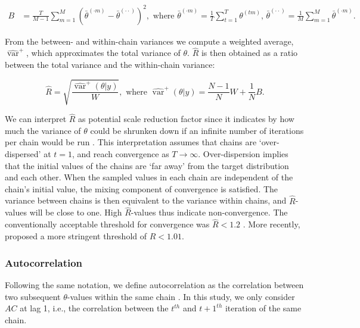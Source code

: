 \documentclass[Royal,times,sageh]{sagej}
\begin{document}
\begin{align*}
B&=\frac{T}{M-1} \sum_{m=1}^{M}\left(\bar{\theta}^{(\cdot m)}-\bar{\theta}^{(\cdot \cdot)}\right)^{2}, \text { where } \bar{\theta}^{(\cdot m)}=\frac{1}{T} \sum_{t=1}^{T} \theta^{(t m)} \text{, } \bar{\theta}^{(\cdot \cdot)}=\frac{1}{M} \sum_{m=1}^{M} \bar{\theta}^{(\cdot m)}. 
\end{align*}

\noindent From the between- and within-chain variances we compute a weighted average, \(\widehat{\operatorname{var}}^{+}\), which approximates the total variance of \(\theta\). \(\widehat{R}\) is then obtained as a ratio between the total variance and the within-chain variance:

\begin{equation*}
\widehat{R}=\sqrt{\frac{\widehat{\operatorname{var}}^{+}(\theta | y)}{W}},
\text{ where } \widehat{\operatorname{var}}^{+}(\theta | y)=\frac{N-1}{N} W+\frac{1}{N} B.
\end{equation*}

We can interpret \(\widehat{R}\) as potential scale reduction factor since it indicates by how much the variance of \(\theta\) could be shrunken down if an infinite number of iterations per chain would be run \citep{gelm92}. This interpretation assumes that chains are `over-dispersed' at \(t=1\), and reach convergence as \(T \to \infty\). Over-dispersion implies that the initial values of the chains are `far away' from the target distribution and each other. When the sampled values in each chain are independent of the chain's initial value, the mixing component of convergence is satisfied. The variance between chains is then equivalent to the variance within chains, and \(\widehat{R}\)-values will be close to one. High \(\widehat{R}\)-values thus indicate non-convergence. The conventionally acceptable threshold for convergence was \(\widehat{R} < 1.2\) \citep{gelm92}. More recently, \citet{veht19} proposed a more stringent threshold of \(\widehat{R} < 1.01\).

\hypertarget{autocorrelation}{%
\subsubsection{Autocorrelation}\label{autocorrelation}}

Following the same notation, we define autocorrelation as the correlation between two subsequent \(\theta\)-values within the same chain \citep[p.~147]{lync07}. In this study, we only consider \(AC\) at lag 1, i.e., the correlation between the \(t^{th}\) and \(t+1^{th}\) iteration of the same chain.
\end{document}
